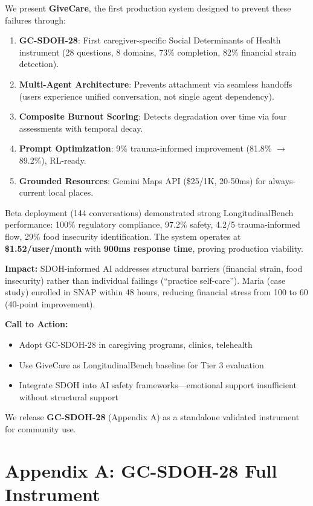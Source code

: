 \documentclass{article}%
\begin{document}
We present \textbf{GiveCare}, the first production system designed to prevent these failures through:
\begin{enumerate}
    \item \textbf{GC-SDOH-28}: First caregiver-specific Social Determinants of Health instrument (28 questions, 8 domains, 73\% completion, 82\% financial strain detection).
    \item \textbf{Multi-Agent Architecture}: Prevents attachment via seamless handoffs (users experience unified conversation, not single agent dependency).
    \item \textbf{Composite Burnout Scoring}: Detects degradation over time via four assessments with temporal decay.
    \item \textbf{Prompt Optimization}: 9\% trauma-informed improvement (81.8\% $\rightarrow$ 89.2\%), RL-ready.
    \item \textbf{Grounded Resources}: Gemini Maps API (\$25/1K, 20-50ms) for always-current local places.
\end{enumerate}

Beta deployment (144 conversations) demonstrated strong LongitudinalBench performance: 100\% regulatory compliance, 97.2\% safety, 4.2/5 trauma-informed flow, 29\% food insecurity identification. The system operates at \textbf{\$1.52/user/month} with \textbf{900ms response time}, proving production viability.

\textbf{Impact:} SDOH-informed AI addresses structural barriers (financial strain, food insecurity) rather than individual failings (``practice self-care''). Maria (case study) enrolled in SNAP within 48 hours, reducing financial stress from 100 to 60 (40-point improvement).

\textbf{Call to Action:}
\begin{itemize}
    \item Adopt GC-SDOH-28 in caregiving programs, clinics, telehealth
    \item Use GiveCare as LongitudinalBench baseline for Tier 3 evaluation
    \item Integrate SDOH into AI safety frameworks—emotional support insufficient without structural support
\end{itemize}

We release \textbf{GC-SDOH-28} (Appendix A) as a standalone validated instrument for community use.

%
\section*{Appendix A: GC-SDOH-28 Full Instrument}
\end{document}

